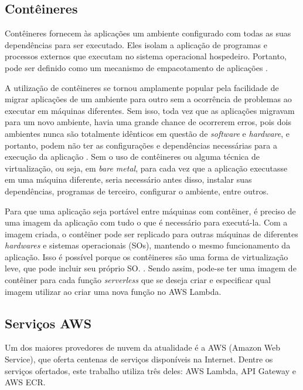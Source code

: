 \documentclass[conference]{IEEEtran}
\begin{document}
\subsection{Contêineres}
\label{subsec:containers}

Contêineres fornecem às aplicações um ambiente configurado com todas as suas dependências para ser executado. Eles isolam a aplicação de programas e processos externos que executam no sistema operacional hospedeiro. Portanto, pode ser definido como um mecanismo de empacotamento de aplicações \cite{Siddiqui_2019_analysis_container}. 

A utilização de contêineres se tornou amplamente popular pela facilidade de migrar aplicações de um ambiente para outro sem a ocorrência de problemas ao executar em máquinas diferentes. Sem isso, toda vez que as aplicações migravam para um novo ambiente, havia uma grande chance de ocorrerem erros, pois dois ambientes nunca são totalmente idênticos em questão de \textit{software} e \textit{hardware}, e portanto, podem não ter as configurações e dependências necessárias para a execução da aplicação  \cite{Siddiqui_2019_analysis_container}. Sem o uso de contêineres ou alguma técnica de virtualização, ou seja, em \textit{bare metal}, para cada vez que a aplicação executasse em uma máquina diferente, seria necessário antes disso, instalar suas dependências, programas de terceiro, configurar o ambiente, entre outros.

Para que uma aplicação seja portável entre máquinas com contêiner, é preciso de uma imagem da aplicação com tudo o que é necessário para executá-la. Com a imagem criada, o contêiner pode ser replicado para outras máquinas de diferentes \textit{hardwares} e sistemas operacionais (SOs), mantendo o mesmo funcionamento da aplicação. Isso é possível porque os contêineres são uma forma de virtualização leve, que pode incluir seu próprio SO. \cite{scheepers_2014_virtualization_containerization}. Sendo assim, pode-se ter uma imagem de contêiner para cada função \textit{serverless} que se deseja criar e especificar qual imagem utilizar ao criar uma nova função no AWS Lambda. 


\subsection{Serviços AWS}
\label{subsec:aws_services}

Um dos maiores provedores de nuvem da atualidade é a AWS (Amazon Web Service), que oferta centenas de serviços disponíveis na Internet. Dentre os serviços ofertados, este trabalho utiliza três deles: AWS Lambda, API Gateway e AWS ECR.
\end{document}

